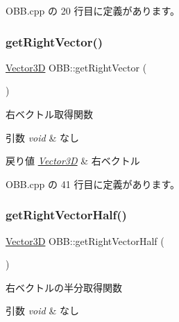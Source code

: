  O\+B\+B.\+cpp の 20 行目に定義があります。

\mbox{\label{class_o_b_b_a7879aad21978ea9dfc5f50a608349b27}} 
\subsubsection{\texorpdfstring{get\+Right\+Vector()}{getRightVector()}}
{\footnotesize\ttfamily \mbox{\hyperlink{class_vector3_d}{Vector3D}} O\+B\+B\+::get\+Right\+Vector (\begin{DoxyParamCaption}{ }\end{DoxyParamCaption})}



右ベクトル取得関数 


\begin{DoxyParams}{引数}
{\em void} & なし \\
\hline
\end{DoxyParams}

\begin{DoxyRetVals}{戻り値}
{\em \mbox{\hyperlink{class_vector3_d}{Vector3D}}} & 右ベクトル \\
\hline
\end{DoxyRetVals}


 O\+B\+B.\+cpp の 41 行目に定義があります。

\mbox{\label{class_o_b_b_ab0452e841ab2c1362b2e6365b27cea97}} 
\subsubsection{\texorpdfstring{get\+Right\+Vector\+Half()}{getRightVectorHalf()}}
{\footnotesize\ttfamily \mbox{\hyperlink{class_vector3_d}{Vector3D}} O\+B\+B\+::get\+Right\+Vector\+Half (\begin{DoxyParamCaption}{ }\end{DoxyParamCaption})}



右ベクトルの半分取得関数 


\begin{DoxyParams}{引数}
{\em void} & なし \\
\hline
\end{DoxyParams}

